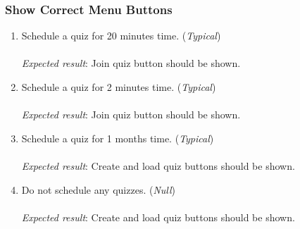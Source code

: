 \subsubsection{Show Correct Menu Buttons} %
\label{ssub:give_appropriate_access_to_quiz}
\begin{enumerate}[leftmargin=*]
\item Schedule a quiz for 20 minutes time. (\textit{Typical})\\\\
\textit{Expected result}: Join quiz button should be shown.\\
\item Schedule a quiz for 2 minutes time. (\textit{Typical})\\\\
\textit{Expected result}: Join quiz button should be shown.\\
\item Schedule a quiz for 1 months time. (\textit{Typical})\\\\
\textit{Expected result}: Create and load quiz buttons should be shown.\\
\item Do not schedule any quizzes. (\textit{Null})\\\\
\textit{Expected result}: Create and load quiz buttons should be shown.
\end{enumerate}

